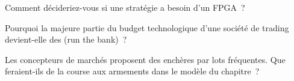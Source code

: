 \begin{interviewq}\label{iq:fm:technology-strategy:4}
Comment décideriez-vous si une stratégie a besoin d'un FPGA~?
\end{interviewq}

\begin{interviewq}\label{iq:fm:technology-strategy:5}
Pourquoi la majeure partie du budget technologique d'une société de trading devient-elle des  (run the bank)~?
\end{interviewq}

\begin{interviewq}\label{iq:fm:technology-strategy:6}
Les concepteurs de marchés proposent des enchères par lots fréquentes. Que feraient-ils de la course aux armements dans le modèle du chapitre~?
\end{interviewq}

